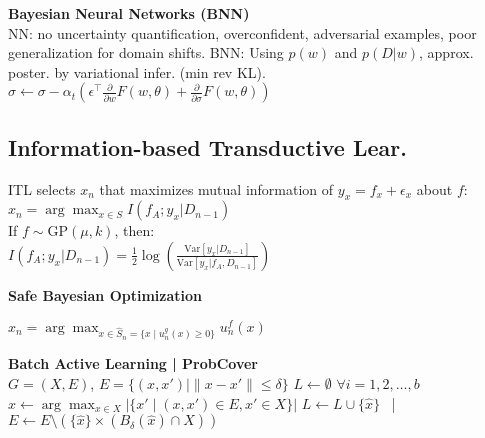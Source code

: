 \textbf{Bayesian Neural Networks (BNN)} \\
NN: no uncertainty quantification, overconfident, adversarial examples, poor generalization for domain shifts.
BNN: Using $p(w)$ and $p(D|w)$, approx. poster. by variational infer. (min rev KL).
$\sigma {\leftarrow} \sigma {-} \alpha_t \left( \epsilon^\top \frac{\partial}{\partial w} F(w, \theta) + \frac{\partial}{\partial \sigma} F(w, \theta) \right)$

\subsection*{Information-based Transductive Lear.}
ITL selects \( x_n \) that maximizes mutual information of \( y_x = f_x + \epsilon_x \) about \( f \):
\\ $x_n = \arg\max_{x \in S} I(f_A; y_x | D_{n-1})$ \\
If \( f \sim \text{GP}(\mu, k) \), then: \\
$I(f_A; y_x | D_{n-1}) = \frac{1}{2} \log \left( \frac{\text{Var}[y_x | D_{n-1}]}{\text{Var}[y_x | f_A, D_{n-1}]} \right)$

\textbf{Safe Bayesian Optimization}

$x_n = \arg\max_{x \in \hat{S}_n= \{ x \mid u^g_n(x) \geq 0 \}} u^f_n(x)$

\textbf{Batch Active Learning | ProbCover} \\
$G {=} (X, E)$, $E {=} \{(x, x') \mid \|x {-} x'\| {\leq} \delta\}$
$L {\gets} \emptyset$
$\forall i = 1, 2, \dots, b$
$\hat{x} \gets \arg\max_{x \in X} |\{x' \mid (x, x') \in E, x' \in X\}|$
$L {\gets} L \cup \{\hat{x}\}$ \ | \ \ 
$E {\gets} E {\setminus} (\{\hat{x}\} {\times} (B_{\delta}(\hat{x}) \cap X))$



